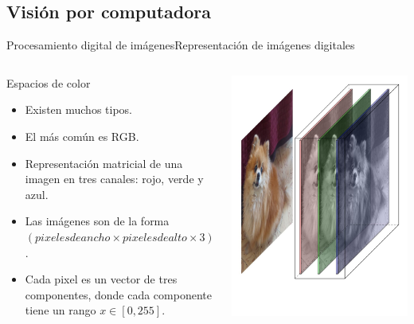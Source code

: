 \documentclass[aspectratio=169,10pt]{beamer}
\begin{document}

\subsection{Visión por computadora}

\begin{frame}{Procesamiento digital de imágenes}{Representación de imágenes digitales}
  \begin{columns}
    \begin{block}{Espacios de color}
      \begin{itemize}
        \item Existen muchos tipos.
        \item El más común es RGB.
        \item Representación matricial de una imagen en tres canales: rojo, verde y azul.
        \item Las imágenes son de la forma $ (pixeles de ancho \times pixeles de alto \times 3) $.
        \item Cada pixel es un vector de tres componentes, donde cada componente tiene un rango $ x \in [0, 255] $.
      \end{itemize}
    \end{block}
    \includegraphics[width=\columnwidth, height=0.9\textheight]{cachito.jpg}
  \end{columns}
\end{frame}
\end{document}
